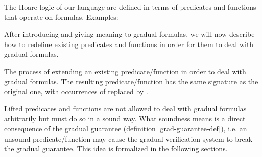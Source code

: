 
The Hoare logic of our language are defined in terms of predicates and functions that operate on formulas.
Examples:

After introducing and giving meaning to gradual formulas, we will now describe how to redefine existing predicates and functions in order for them to deal with gradual formulas.

\begin{definition}
    The process of extending an existing predicate/function in order to deal with gradual formulas.
    The resulting predicate/function has the same signature as the original one, with occurrences of \setFormula replaced by \setGFormula.
\end{definition}

Lifted predicates and functions are not allowed to deal with gradual formulas arbitrarily but must do so in a sound way.
What soundness means is a direct consequence of the gradual guarantee (definition \ref{grad-guarantee-def}), i.e. an unsound predicate/function may cause the gradual verification system to break the gradual guarantee.
This idea is formalized in the following sections.